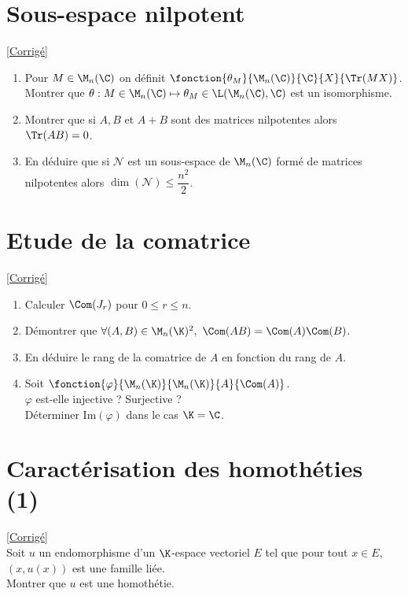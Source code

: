 \documentclass[8pt]{book}
\begin{document}
\section{Sous-espace nilpotent }
\label{Sous-espace nilpotent}
\textcolor{blue}{\hyperref[Sous-espace nilpotent corrigé]{[Corrigé]}}\\
\begin{enumerate}[leftmargin=*]
	\item Pour $M\in \M_n(\C)$ on définit $\fonction{\theta_M}{\M_n(\C)}{\C}{X}{\Tr(MX)}$.\\
	Montrer que $\theta:M\in \M_n(\C)\mapsto \theta_M\in \L(\M_n(\C),\C)$ est un isomorphisme.
	\item Montrer que si $A,B$ et $A+B$ sont des matrices nilpotentes alors $\Tr(AB)=0$.
	\item En déduire que si $\mathcal N$ est un sous-espace de $\M_n(\C)$ formé de matrices nilpotentes alors $\dim(\mathcal N)\leq \dfrac{n^2}{2}$.
\end{enumerate}

\section{Etude de la comatrice }
\label{Etude de la comatrice}
\textcolor{blue}{\hyperref[Etude de la comatrice corrigé]{[Corrigé]}}\\
\begin{enumerate}[leftmargin=*]
	\item Calculer $\Com(J_r)$ pour $0\leq r\leq n$.
	\item Démontrer que $\forall (A,B)\in \M_n(\K)^2,\ \Com(AB)=\Com(A)\Com(B)$.
	\item En déduire le rang de la comatrice de $A$ en fonction du rang de $A$.
	\item Soit $\fonction{\varphi}{\M_n(\K)}{\M_n(\K)}{A}{\Com(A)}$.\\
	$\varphi$ est-elle injective ? Surjective ? \\Déterminer $\text{Im}(\varphi)$ dans le cas $\K=\C$.
\end{enumerate}

\section{Caractérisation des homothéties (1) }
\label{Caractérisation des homothéties (1)}
\textcolor{blue}{\hyperref[Caractérisation des homothéties (1) corrigé]{[Corrigé]}}\\
Soit $u$ un endomorphisme d'un $\K$-espace vectoriel $E$ tel que pour tout $x\in E$, $(x,u(x))$ est une famille liée.\\
Montrer que $u$ est une homothétie.
\end{document}
